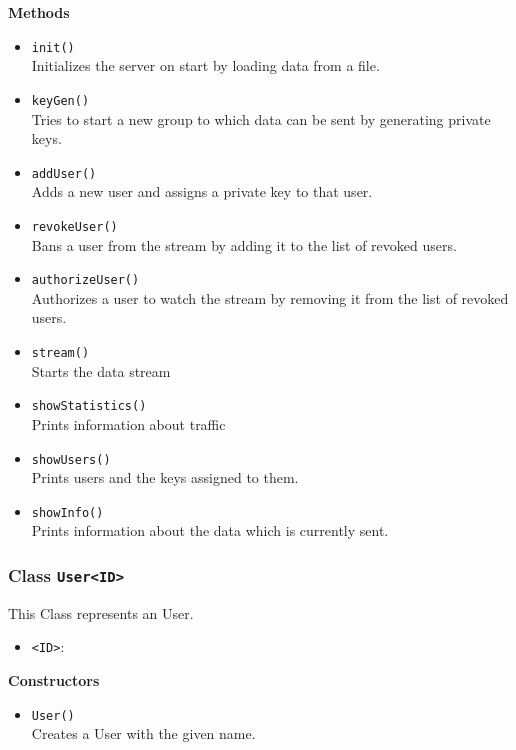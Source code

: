 \textbf{Methods}
\begin{itemize}
\item \lstinline|init()| \\
Initializes the server on start by loading data from a file.

\item \lstinline|keyGen()| \\
Tries to start a new group to which data can be sent by generating private keys.

\item \lstinline|addUser()| \\
Adds a new user and assigns a private key to that user.

\item \lstinline|revokeUser()| \\
Bans a user from the stream by adding it to the list of revoked users.

\item \lstinline|authorizeUser()| \\
Authorizes a user to watch the stream by removing it from the list of revoked users.

\item \lstinline|stream()| \\
Starts the data stream

\item \lstinline|showStatistics()| \\
Prints information about traffic

\item \lstinline|showUsers()| \\
Prints users and the keys assigned to them.

\item \lstinline|showInfo()| \\
Prints information about the data which is currently sent.

\end{itemize}

\subsubsection{Class \lstinline|User<ID>|}
This Class represents an User.
\begin{itemize}
\item \lstinline|<ID>|: 
\end{itemize}

\textbf{Constructors}
\begin{itemize}
\item \lstinline|User()| \\
Creates a User with the given name.

\end{itemize}

